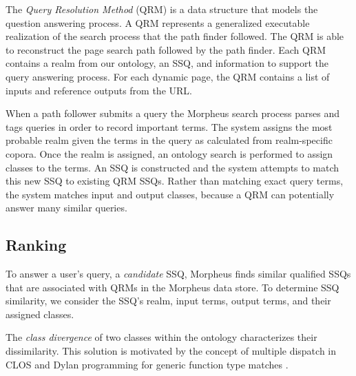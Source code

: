 \begin{table}[h]
	\caption{Example SSQ model}
	\label{tab:ssq_example}
\end{table}


The \emph{Query Resolution Method} (QRM) is a data structure that models the question answering process. A QRM represents a generalized executable realization of the search process that the path finder followed. The QRM is able to reconstruct the page search path followed by the path finder. Each QRM contains a realm from our ontology, an SSQ, and information to support the query answering process. For each dynamic page, the QRM contains a list of inputs and reference outputs from the URL.


When a path follower submits a query the Morpheus search process parses and tags queries in order to record important terms. The system assigns the most probable realm given the terms in the query as calculated from realm-specific copora. Once the realm is assigned, an ontology search is performed to assign classes to the terms. An SSQ is constructed and the system attempts to match this new SSQ to existing QRM SSQs. Rather than matching exact query terms, the system matches input and output classes, because a QRM can potentially answer many similar queries.


\subsection{Ranking} 
\label{sec:qrm_ranking}

To answer a user's query, a \emph{candidate} SSQ, Morpheus finds similar qualified SSQs that are associated with QRMs in the Morpheus data store.  To determine SSQ similarity, we consider the SSQ's realm, input terms, output terms, and their assigned classes. 

The \emph{class divergence} of two classes within the ontology characterizes their dissimilarity.  This solution is motivated by the concept of multiple dispatch in CLOS and Dylan programming for generic function type matches \cite{Barrett1996}. 

